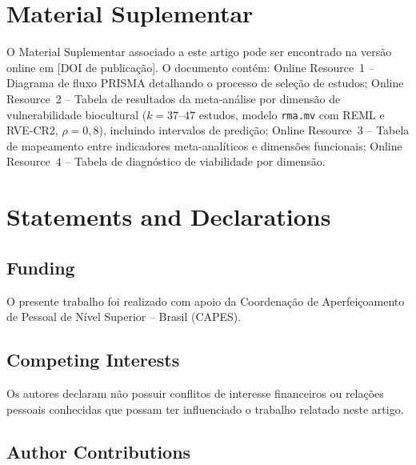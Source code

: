 \documentclass[12pt,a4paper]{article}
\begin{document}
\section*{Material Suplementar}

O Material Suplementar associado a este artigo pode ser encontrado na versão online em [DOI de publicação]. O documento contém: Online Resource~1 -- Diagrama de fluxo PRISMA detalhando o processo de seleção de estudos; Online Resource~2 -- Tabela de resultados da meta-análise por dimensão de vulnerabilidade biocultural ($k = 37$--$47$ estudos, modelo \texttt{rma.mv} com REML e RVE-CR2, $\rho = 0{,}8$), incluindo intervalos de predição; Online Resource~3 -- Tabela de mapeamento entre indicadores meta-analíticos e dimensões funcionais; Online Resource~4 -- Tabela de diagnóstico de viabilidade por dimensão.




\section*{Statements and Declarations}

\subsection*{Funding}

O presente trabalho foi realizado com apoio da Coordenação de Aperfeiçoamento de Pessoal de Nível Superior -- Brasil (CAPES).

\subsection*{Competing Interests}

Os autores declaram não possuir conflitos de interesse financeiros ou relações pessoais conhecidas que possam ter influenciado o trabalho relatado neste artigo.

\subsection*{Author Contributions}
\end{document}
